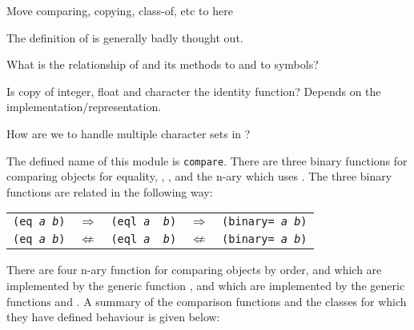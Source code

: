 \label{compare}
%
\begin{optPrivate}
    Move comparing, copying, class-of, etc to here

    The definition of \functionref{=} is generally badly thought out.

    What is the relationship of  and its methods to
     and to symbols?

    Is copy of integer, float and character the identity function?  Depends on
    the implementation/representation.

    How are we to handle multiple character sets in ?
\end{optPrivate}
%
\begin{optDefinition}
%
The defined name of this module is {\tt compare}.  There are three binary
functions for comparing objects for equality, ,
,  and the n-ary \functionref{=} which uses
.  The three binary functions are related in the following
way:
%
\begin{center}
\begin{tabular}{rcccl}
    {\tt (eq {\em a} {\em b})} & $\Rightarrow$ & {\tt (eql {\em a} {\em
            b})} & $\Rightarrow$ & {\tt (binary= {\em a} {\em b})}\\
    {\tt (eq {\em a} {\em b})} & $\not\Leftarrow$ & {\tt (eql {\em a} {\em
            b})} & $\not\Leftarrow$ & {\tt (binary= {\em a} {\em b})}\\
\end{tabular}
\end{center}
%
There are four n-ary function for comparing objects by order, \functionref{<}
and \functionref{>} which are implemented by the generic function
, \functionref{<=} and \functionref{>=} which are
implemented by the generic functions  and
.  A summary of the comparison functions and the classes for
which they have defined behaviour is given below:


\end{optDefinition}
